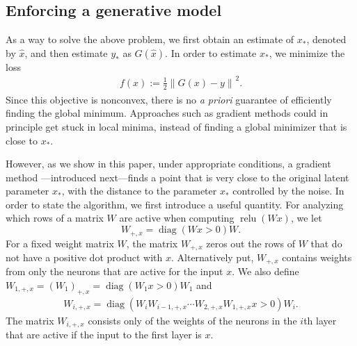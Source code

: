 \documentclass[11pt]{article}
\newcommand{\xo}{x_\ast}
\newcommand{\Wplus}[1]{W_{+, #1}}
\newcommand{\Wpx}{\Wplus{x}}
\newcommand{\Wnpx}[1]{W_{#1, +, x}}
\newcommand{\Wipx}{W_{i, +, x}}
\newcommand{\Win}[1]{W_{#1}}
\newcommand{\Wi}{\Win{i}}
\DeclareMathOperator{\relu}{relu}
\DeclareMathOperator{\diag}{diag}
\newcommand{\Tnorm}{}
\newcommand\norm[2][\Tnorm]{\ensuremath{{\left\|#2\right\|}_{#1}}}
\begin{document}
\subsection{Enforcing a generative model}

As a way to solve the above problem, we first obtain an estimate of $\xo$, denoted by $\hat x$, and then estimate $y_\ast$ as $G(\hat x)$.
In order to estimate $\xo$, we minimize the loss
\begin{align*}
f(x) := \frac{1}{2} \norm{ G(x) - y }^2. %
\end{align*}
Since this objective is nonconvex, there is no \textit{a priori} guarantee of efficiently finding the global minimum. %
Approaches such as gradient methods could in principle get stuck in local minima, instead of finding a global minimizer that is close to $\xo$.

However, as we show in this paper, under appropriate conditions, a gradient method ---introduced next---finds a point that is very close to the original latent parameter $\xo$, with the distance to the parameter $\xo$ controlled by the noise.
In order to state the algorithm, we first introduce a useful quantity.
For analyzing which rows of a matrix $W$ are active when computing $\relu(Wx)$, we let
\[
\Wpx = \diag(Wx>0) W.
\]
For a fixed weight matrix $W$, the matrix $\Wpx$ zeros out the rows of $W$ that do not have a positive dot product with $x$.  Alternatively put, $\Wpx$ contains weights from only the neurons that are active for the input $x$.  We also define $\Wnpx{1} = (W_1)_{+,x} =  \diag(W_{1}x>0) W_1$ and
\begin{align*}
\Wipx = \diag(\Wi \Wnpx{i-1} \cdots \Wnpx{2} \Wnpx{1} x > 0) \Wi.
\end{align*}
The matrix $\Wipx$ consists only of the weights of the neurons in the $i$th layer that are active if the input to the first layer is  $x$.

\end{document}
